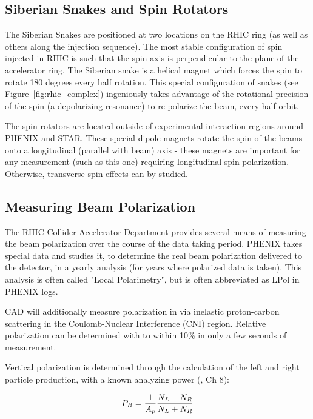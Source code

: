 \subsection{Siberian Snakes and Spin Rotators}

The Siberian Snakes are positioned at two locations on the RHIC ring (as well as
others along the injection sequence). The most stable configuration of spin
injected in RHIC is such that the spin axis is perpendicular to the plane of the
accelerator ring. The Siberian snake is a helical magnet which forces the spin
to rotate 180 degrees every half rotation. This special configuration of snakes
(see Figure~\ref{fig:rhic_complex}) ingeniously takes advantage of the
rotational precision of the spin (a depolarizing resonance) to re-polarize the
beam, every half-orbit.

The spin rotators are located outside of experimental interaction regions around
PHENIX and STAR. These special dipole magnets rotate the spin of the beams onto
a longitudinal (parallel with beam) axis - these magnets are important for any
measurement (such as this one) requiring longitudinal spin polarization.
Otherwise, transverse spin effects can by studied.

\subsection{Measuring Beam Polarization}

The RHIC Collider-Accelerator Department provides several means of measuring the
beam polarization over the course of the data taking period. PHENIX takes
special data and studies it, to determine the real beam polarization delivered
to the detector, in a yearly analysis (for years where polarized data is taken).
This analysis is often called "Local Polarimetry", but is often abbreviated as
LPol in PHENIX logs.

CAD will additionally measure polarization in via inelastic proton-carbon
scattering in the Coulomb-Nuclear Interference (CNI) region. Relative
polarization can be determined with to within 10\% in only a few seconds of
measurement. 

Vertical polarization is determined through the calculation of the left and
right particle production, with a known analyzing power (\cite{RHIC2006}, Ch 8):

\begin{equation}
  P_B = {{1}\over{A_p}}{{N_L-N_R}\over{N_L+N_R}}
  \label{eq:rhic_polarization}
\end{equation}

